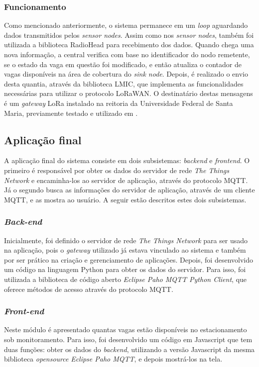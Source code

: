 \documentclass[oneside,openright,12pt]{ufsm_2015} %
\begin{document}
    \subsubsection{Funcionamento}
    Como mencionado anteriormente, o sistema permanece em um \textit{loop} aguardando dados transmitidos pelos \textit{sensor nodes}.
    Assim como nos \textit{sensor nodes}, também foi utilizada a biblioteca RadioHead para recebimento dos dados. Quando chega uma nova informação, a central verifica com base no identificador do nodo remetente, se o estado da vaga em questão foi modificado, e então atualiza o contador de vagas disponíveis na área de cobertura do \textit{sink node}. Depois, é realizado o envio desta quantia, através da biblioteca LMIC, que implementa as funcionalidades necessárias para utilizar o protocolo LoRaWAN. O destinatário destas mensagens é um \textit{gateway} LoRa instalado na reitoria da Universidade Federal de Santa Maria, previamente testado e utilizado em \cite{tcc:matheus-neis}.
    
    
    \subsection{Aplicação final}
    A aplicação final do sistema consiste em dois subsistemas: \textit{backend} e \textit{frontend}. O primeiro é responsável por obter os dados do servidor de rede \textit{The Things Network} e encaminha-los ao servidor de aplicação, através do protocolo MQTT. Já o segundo busca as informações do servidor de aplicação, através de um cliente MQTT, e as mostra ao usuário.
    A seguir estão descritos estes dois subsistemas.
    
    \subsubsection{\textit{Back-end}}
    Inicialmente, foi definido o servidor de rede \textit{The Things Network} para ser usado na aplicação, pois o \textit{gateway} utilizado já estava vinculado ao sistema e também por ser prático na criação e gerenciamento de aplicações. Depois, foi desenvolvido um código na linguagem Python para obter os dados do servidor. Para isso, foi utilizada a biblioteca de código aberto \textit{Eclipse Paho MQTT Python Client}, que oferece métodos de acesso através do protocolo MQTT. 
    
    \subsubsection{\textit{Front-end}}
    Neste módulo é apresentado quantas vagas estão disponíveis no estacionamento sob monitoramento. Para isso, foi desenvolvido um código em Javascript que tem duas funções: obter os dados do \textit{backend}, utilizando a versão Javascript da mesma biblioteca \textit{opensource} \textit{Eclipse Paho MQTT}, e depois mostrá-los na tela. 
    
\end{document}
